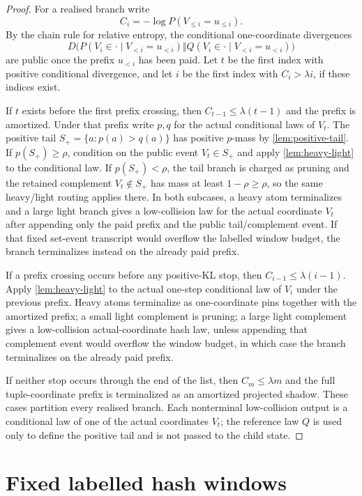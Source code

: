 \documentclass[11pt]{article}
\newcommand{\Cref}[1]{\ref{#1}}
\theoremstyle{remark}
\begin{document}
\begin{proof}
For a realised branch write
\[
        C_i=-\log P(V_{\le i}=u_{\le i}).
\]
By the chain rule for relative entropy, the conditional one-coordinate divergences
\[
        D\bigl(P(V_i\in\cdot\mid V_{<i}=u_{<i})\Vert
          Q(V_i\in\cdot\mid V_{<i}=u_{<i})\bigr)
\]
are public once the prefix $u_{<i}$ has been paid.  Let $t$ be the first index with positive conditional divergence, and let $i$ be the first index with $C_i>\lambda i$, if these indices exist.

If $t$ exists before the first prefix crossing, then $C_{t-1}\le\lambda(t-1)$ and the prefix is amortized.  Under that prefix write $p,q$ for the actual conditional laws of $V_t$.  The positive tail $S_+=\{a:p(a)>q(a)\}$ has positive $p$-mass by \Cref{lem:positive-tail}.  If $p(S_+)\ge\rho$, condition on the public event $V_t\in S_+$ and apply \Cref{lem:heavy-light} to the conditional law.  If $p(S_+)<\rho$, the tail branch is charged as pruning and the retained complement $V_t\notin S_+$ has mass at least $1-\rho\ge\rho$, so the same heavy/light routing applies there.  In both subcases, a heavy atom terminalizes and a large light branch gives a low-collision law for the actual coordinate $V_t$ after appending only the paid prefix and the public tail/complement event.  If that fixed set-event transcript would overflow the labelled window budget, the branch terminalizes instead on the already paid prefix.

If a prefix crossing occurs before any positive-KL stop, then $C_{i-1}\le\lambda(i-1)$.  Apply \Cref{lem:heavy-light} to the actual one-step conditional law of $V_i$ under the previous prefix.  Heavy atoms terminalize as one-coordinate pins together with the amortized prefix; a small light complement is pruning; a large light complement gives a low-collision actual-coordinate hash law, unless appending that complement event would overflow the window budget, in which case the branch terminalizes on the already paid prefix.

If neither stop occurs through the end of the list, then $C_m\le\lambda m$ and the full tuple-coordinate prefix is terminalized as an amortized projected shadow.  These cases partition every realised branch.  Each nonterminal low-collision output is a conditional law of one of the actual coordinates $V_t$; the reference law $Q$ is used only to define the positive tail and is not passed to the child state.
\end{proof}

\section{Fixed labelled hash windows}
\end{document}
